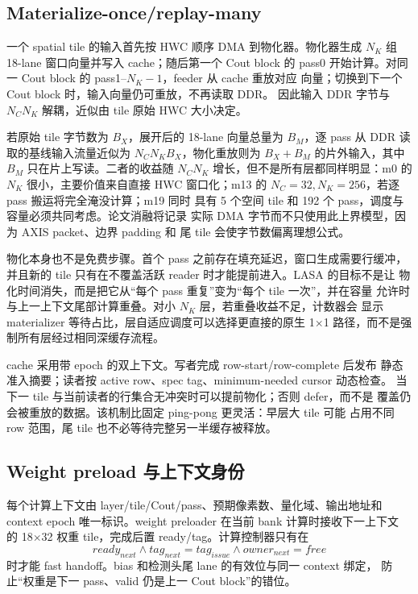 \subsection{Materialize-once/replay-many}

一个 spatial tile 的输入首先按 HWC 顺序 DMA 到物化器。物化器生成
$N_K$ 组 18-lane 窗口向量并写入 cache；随后第一个 Cout block 的 pass0
开始计算。对同一 Cout block 的 pass1--$N_K-1$，feeder 从 cache 重放对应
向量；切换到下一个 Cout block 时，输入向量仍可重放，不再读取 DDR。
因此输入 DDR 字节与 $N_C N_K$ 解耦，近似由 tile 原始 HWC 大小决定。

若原始 tile 字节数为 $B_X$，展开后的 18-lane 向量总量为 $B_M$，逐 pass
从 DDR 读取的基线输入流量近似为 $N_C N_K B_X$，物化重放则为
$B_X+B_M$ 的片外输入，其中 $B_M$ 只在片上写读。二者的收益随 $N_C N_K$
增长，但不是所有层都同样明显：m0 的 $N_K$ 很小，主要价值来自直接 HWC
窗口化；m13 的 $N_C=32,N_K=256$，若逐 pass 搬运将完全淹没计算；m19 同时
具有 5 个空间 tile 和 192 个 pass，调度与容量必须共同考虑。论文消融将记录
实际 DMA 字节而不只使用此上界模型，因为 AXIS packet、边界 padding 和
尾 tile 会使字节数偏离理想公式。

物化本身也不是免费步骤。首个 pass 之前存在填充延迟，窗口生成需要行缓冲，
并且新的 tile 只有在不覆盖活跃 reader 时才能提前进入。LASA 的目标不是让
物化时间消失，而是把它从“每个 pass 重复”变为“每个 tile 一次”，并在容量
允许时与上一上下文尾部计算重叠。对小 $N_K$ 层，若重叠收益不足，计数器会
显示 materializer 等待占比，层自适应调度可以选择更直接的原生 1$\times$1
路径，而不是强制所有层经过相同深缓存流程。

cache 采用带 epoch 的双上下文。写者完成 row-start/row-complete 后发布
静态准入摘要；读者按 active row、spec tag、minimum-needed cursor 动态检查。
当下一 tile 与当前读者的行集合无冲突时可以提前物化；否则 defer，而不是
覆盖仍会被重放的数据。该机制比固定 ping-pong 更灵活：早层大 tile 可能
占用不同 row 范围，尾 tile 也不必等待完整另一半缓存被释放。

\subsection{Weight preload 与上下文身份}

每个计算上下文由 layer/tile/Cout/pass、预期像素数、量化域、输出地址和
context epoch 唯一标识。weight preloader 在当前 bank 计算时接收下一上下文
的 18$\times$32 权重 tile，完成后置 ready/tag。计算控制器只有在
\begin{equation}
ready_{next}\land tag_{next}=tag_{issue}\land owner_{next}=free
\end{equation}
时才能 fast handoff。bias 和检测头尾 lane 的有效位与同一 context 绑定，
防止“权重是下一 pass、valid 仍是上一 Cout block”的错位。

